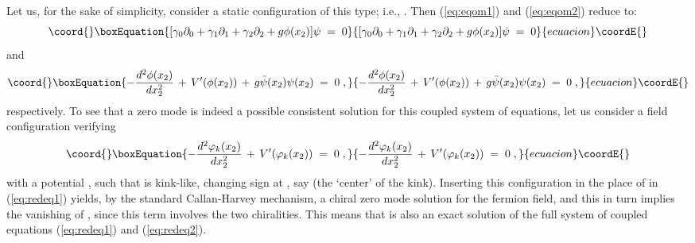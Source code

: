 \documentclass[a4paper,12pt]{article}
\begin{document}
Let us, for the sake of simplicity, consider a static configuration 
of this type; i.e., \coordHE{}. Then (\ref{eq:eqom1}) and 
(\ref{eq:eqom2}) reduce to:
\begin{equation}\coord{}\boxEquation{
  \label{eq:redeq1}
[\gamma_0 \partial_0 + \gamma_1 \partial_1 + \gamma_2 \partial_2 + g \phi(x_2) ] \psi \;=\;0
}{
  [\gamma_0 \partial_0 + \gamma_1 \partial_1 + \gamma_2 \partial_2 + g \phi(x_2) ] \psi \;=\;0
}{ecuacion}\coordE{}\end{equation}
and
\begin{equation}\coord{}\boxEquation{
  \label{eq:redeq2}
- \frac{d^2\phi(x_2)}{dx_2^2} \,+\, V'(\phi(x_2)) \,+\,
 g {\bar\psi}(x_2) \psi(x_2) \;=\; 0 \;,
}{
  - \frac{d^2\phi(x_2)}{dx_2^2} \,+\, V'(\phi(x_2)) \,+\,
 g {\bar\psi}(x_2) \psi(x_2) \;=\; 0 \;,
}{ecuacion}\coordE{}\end{equation}
respectively. To see that a zero mode is indeed a possible consistent
solution for this coupled system of equations, let us consider a field
configuration \coordHE{} verifying
\begin{equation}\coord{}\boxEquation{
  \label{eq:redeq21}
- \frac{d^2\varphi_k(x_2)}{dx_2^2} \,+\, V'(\varphi_k(x_2)) \;=\; 0 \;,
}{
  - \frac{d^2\varphi_k(x_2)}{dx_2^2} \,+\, V'(\varphi_k(x_2)) \;=\; 0 \;,
}{ecuacion}\coordE{}\end{equation}
with a potential \coordHE{}, such that \coordHE{} is kink-like, changing
sign at \coordHE{}, say (the `center' of the kink). Inserting this
configuration \coordHE{} in the place of \myHighlight{$\phi$}\coordHE{} in (\ref{eq:redeq1})
yields, by the standard Callan-Harvey mechanism, a chiral zero mode 
solution for the fermion field, and this in
turn implies the vanishing of \myHighlight{${\bar\psi}\psi$}\coordHE{}, since this term
involves the two chiralities.  This means that \coordHE{} is also an
exact solution of the full system of coupled equations (\ref{eq:redeq1}) 
and (\ref{eq:redeq2}).
\end{document}
